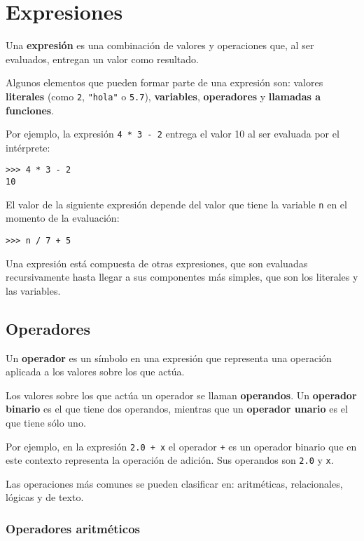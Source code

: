 \chapter{Expresiones}

Una \textbf{expresión} es una combinación de valores y operaciones que,
al ser evaluados, entregan un valor como resultado.

Algunos elementos que pueden formar parte de una expresión son: va\-lores
\textbf{lite\-rales} (como \lstinline!2!, \lstinline!"hola"! o
\lstinline!5.7!), \textbf{variables}, \textbf{operadores} y
\textbf{llamadas a funciones}.

Por ejemplo, la expresión \lstinline!4 * 3 - 2! entrega el valor 10 al
ser evaluada por el intérprete:

\begin{lstlisting}
>>> 4 * 3 - 2
10
\end{lstlisting}

El valor de la siguiente expresión depende del valor que tiene la
variable \lstinline!n! en el momento de la evaluación:

\begin{lstlisting}
>>> n / 7 + 5
\end{lstlisting}

Una expresión está compuesta de otras expresiones, que son evaluadas
recursivamente hasta llegar a sus componentes más simples, que son los
literales y las variables.

\section{Operadores}

Un \textbf{operador} es un símbolo en una expresión que representa una
operación aplicada a los valores sobre los que actúa.

Los valores sobre los que actúa un operador se llaman
\textbf{operandos}. Un \textbf{operador binario} es el que tiene dos
operandos, mientras que un \textbf{operador unario} es el que tiene sólo
uno.

Por ejemplo, en la expresión \lstinline!2.0 + x! el operador
\lstinline!+! es un operador binario que en este contexto representa la
operación de adición. Sus operandos son \lstinline!2.0! y \lstinline!x!.

Las operaciones más comunes se pueden clasificar en: aritméticas,
relacionales, lógicas y de texto.

\subsection{Operadores aritméticos}

